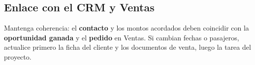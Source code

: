 \subsection{Enlace con el CRM y Ventas}

Mantenga coherencia: el \textbf{contacto} y los montos acordados deben coincidir con la \textbf{oportunidad ganada} y el \textbf{pedido} en Ventas. Si cambian fechas o pasajeros, actualice primero la ficha del cliente y los documentos de venta, luego la tarea del proyecto.
